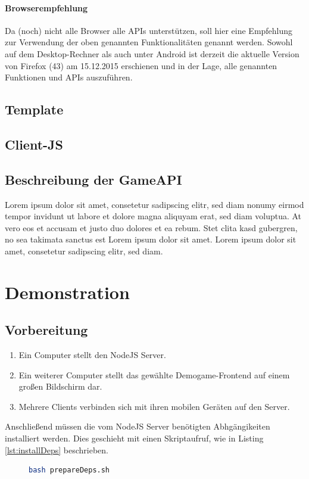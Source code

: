 \documentclass[a4paper]{spie}  %
\begin{document}
\paragraph{Browserempfehlung}
Da (noch) nicht alle Browser alle APIs unterstützen, soll hier eine Empfehlung zur Verwendung der oben genannten Funktionalitäten genannt werden. Sowohl auf dem Desktop-Rechner als auch unter Android ist derzeit die aktuelle Version von Firefox (43) am 15.12.2015 erschienen und in der Lage, alle genannten Funktionen und APIs auszuführen.

\subsection{Template} %
\subsection{Client-JS} %

\subsection{Beschreibung der GameAPI} %
Lorem ipsum dolor sit amet, consetetur sadipscing elitr, sed diam nonumy eirmod tempor invidunt ut labore et dolore magna aliquyam erat, sed diam voluptua. At vero eos et accusam et justo duo dolores et ea rebum. Stet clita kasd gubergren, no sea takimata sanctus est Lorem ipsum dolor sit amet. Lorem ipsum dolor sit amet, consetetur sadipscing elitr, sed diam.


\section{Demonstration}
\subsection{Vorbereitung}
\begin{enumerate}
 \item Ein Computer stellt den NodeJS Server.
 \item Ein weiterer Computer stellt das gewählte Demogame-Frontend auf einem großen Bildschirm dar.
 \item Mehrere Clients verbinden sich mit ihren mobilen Geräten auf den Server.
\end{enumerate}
Anschließend müssen die vom NodeJS Server benötigten Abhgängikeiten installiert werden. Dies geschieht mit einen Skriptaufruf, wie in Listing \ref{lst:installDeps} beschrieben.
\lstset{
  numbers=left,
  stepnumber=5,
  firstnumber=1,
  numberfirstline=true
}
\begin{figure}[h!]
	\centering
        \begin{lstlisting}[language=bash,caption={Installieren der Abhängigkeitenn},label={lst:installDeps}]
           bash prepareDeps.sh
        \end{lstlisting}
\end{figure}
\end{document}
